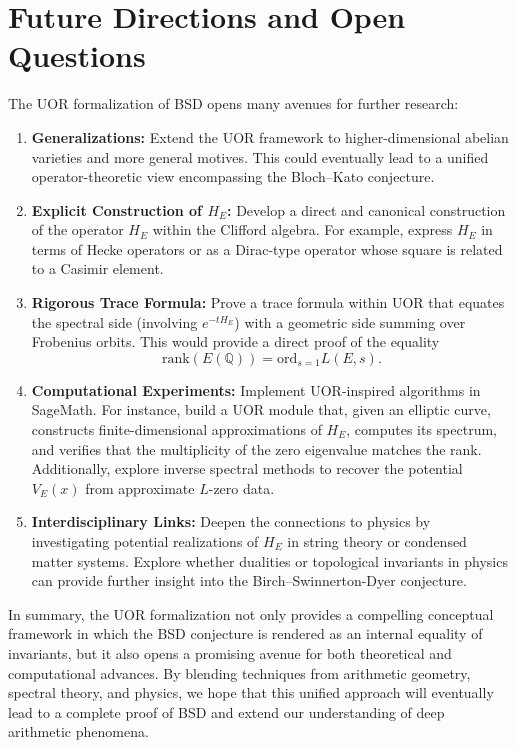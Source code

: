 \documentclass[11pt]{article}
\begin{document}
\section{Future Directions and Open Questions}

The UOR formalization of BSD opens many avenues for further research:
\begin{enumerate}[label=(\arabic*)]
  \item \textbf{Generalizations:} Extend the UOR framework to higher-dimensional abelian varieties and more general motives. This could eventually lead to a unified operator-theoretic view encompassing the Bloch--Kato conjecture.
  \item \textbf{Explicit Construction of \(H_E\):} Develop a direct and canonical construction of the operator \(H_E\) within the Clifford algebra. For example, express \(H_E\) in terms of Hecke operators or as a Dirac-type operator whose square is related to a Casimir element.
  \item \textbf{Rigorous Trace Formula:} Prove a trace formula within UOR that equates the spectral side (involving \(e^{-tH_E}\)) with a geometric side summing over Frobenius orbits. This would provide a direct proof of the equality 
  \[
  \mathrm{rank}(E(\mathbb{Q})) = \mathrm{ord}_{s=1} L(E,s).
  \]
  \item \textbf{Computational Experiments:} Implement UOR-inspired algorithms in SageMath. For instance, build a UOR module that, given an elliptic curve, constructs finite-dimensional approximations of \(H_E\), computes its spectrum, and verifies that the multiplicity of the zero eigenvalue matches the rank. Additionally, explore inverse spectral methods to recover the potential \(V_E(x)\) from approximate \(L\)-zero data.
  \item \textbf{Interdisciplinary Links:} Deepen the connections to physics by investigating potential realizations of \(H_E\) in string theory or condensed matter systems. Explore whether dualities or topological invariants in physics can provide further insight into the Birch--Swinnerton-Dyer conjecture.
\end{enumerate}

In summary, the UOR formalization not only provides a compelling conceptual framework in which the BSD conjecture is rendered as an internal equality of invariants, but it also opens a promising avenue for both theoretical and computational advances. By blending techniques from arithmetic geometry, spectral theory, and physics, we hope that this unified approach will eventually lead to a complete proof of BSD and extend our understanding of deep arithmetic phenomena.
\end{document}
